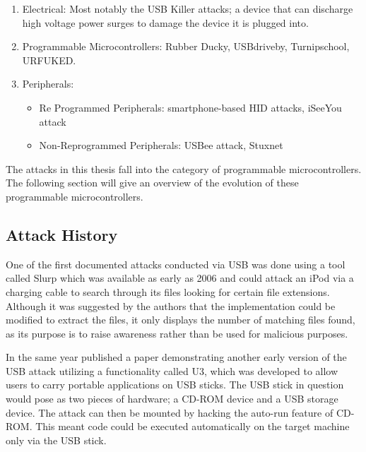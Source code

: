 \begin{enumerate}
  \item Electrical: Most notably the USB Killer attacks; a device that can discharge high voltage power surges to damage the device it is plugged into. \cite{USBKillDevices}
  \item Programmable Microcontrollers: Rubber Ducky, USBdriveby, Turnipschool, URFUKED.
  \item Peripherals:
  \begin{itemize}
      \item Re Programmed Peripherals: smartphone-based HID attacks, iSeeYou attack
      \item Non-Reprogrammed Peripherals: USBee attack, Stuxnet
  \end{itemize}
\end{enumerate}
	

The attacks in this thesis fall into the category of programmable microcontrollers. The following section will give an overview of the evolution of these programmable microcontrollers.

\subsection{Attack History} \label{HistoryOfAttacks}

One of the first documented attacks conducted via USB was done using a tool called Slurp \cite{SharpIdeasDownloads2006} which was available as early as 2006 and could attack an iPod via a charging cable to search through its files looking for certain file extensions. Although it was suggested by the authors that the implementation could be modified to extract the files, it only displays the number of matching files found, as its purpose is to raise awareness rather than be used for malicious purposes.

In the same year \cite{al-zarouniRealityRisksConsented2006} published a paper demonstrating another early version of the USB attack utilizing a functionality called U3, which was developed to allow users to carry portable applications on USB sticks. The USB stick in question would pose as two pieces of hardware; a CD-ROM device and a USB storage device. The attack can then be mounted by hacking the auto-run feature of CD-ROM. This meant code could be executed automatically on the target machine only via the USB stick. 

